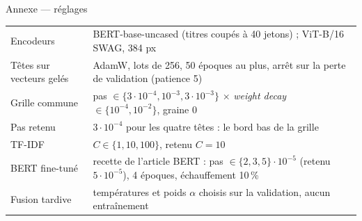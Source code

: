 \documentclass[aspectratio=169,11pt]{beamer}
\begin{document}
\begin{frame}{Annexe — réglages}
\small
\begin{tabular}{@{}p{4.1cm}p{9.6cm}@{}}
\toprule
Encodeurs & BERT-base-uncased (titres coupés à 40 jetons) ; ViT-B/16 SWAG, 384 px\\
Têtes sur vecteurs gelés & AdamW, lots de 256, 50 époques au plus, arrêt sur la perte de validation (patience 5)\\
Grille commune & pas $\in\{3\cdot10^{-4}, 10^{-3}, 3\cdot10^{-3}\}$ $\times$ \emph{weight decay} $\in\{10^{-4}, 10^{-2}\}$, graine 0\\
Pas retenu & $3\cdot10^{-4}$ pour les quatre têtes : le bord bas de la grille\\
TF-IDF & $C\in\{1, 10, 100\}$, retenu $C=10$\\
BERT fine-tuné & recette de l'article BERT : pas $\in\{2, 3, 5\}\cdot10^{-5}$ (retenu $5\cdot10^{-5}$), 4 époques, échauffement 10\,\%\\
Fusion tardive & températures et poids $\alpha$ choisis sur la validation, aucun entraînement\\
\bottomrule
\end{tabular}
\end{frame}
\end{document}
